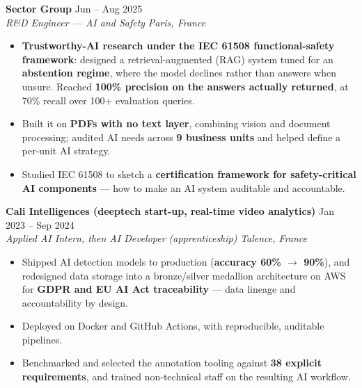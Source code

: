 \documentclass[10pt, letterpaper]{article}
\newcommand{\entry}[4]{%
  \noindent \textbf{#1} \hfill #2 \\
  \textit{#3} \hfill \textit{#4} \par
}
\begin{document}
\vspace{5pt}

\entry{Sector Group}{Jun -- Aug 2025}{R\&D Engineer --- AI and Safety}{Paris, France}
\begin{itemize}
    \item \textbf{Trustworthy-AI research under the \textbf{IEC 61508} functional-safety framework}: designed a retrieval-augmented (RAG) system tuned for an \textbf{abstention regime}, where the model declines rather than answers when unsure. Reached \textbf{100\% precision on the answers actually returned}, at 70\% recall over 100+ evaluation queries.
    \item Built it on \textbf{PDFs with no text layer}, combining vision and document processing; audited AI needs across \textbf{9 business units} and helped define a per-unit AI strategy.
    \item Studied IEC 61508 to sketch a \textbf{certification framework for safety-critical AI components} --- how to make an AI system auditable and accountable.
\end{itemize}

\vspace{5pt}

\entry{Cali Intelligences (deeptech start-up, real-time video analytics)}{Jan 2023 -- Sep 2024}%
{Applied AI Intern, then AI Developer (apprenticeship)}{Talence, France}
\begin{itemize}
    \item Shipped AI detection models to production (\textbf{accuracy 60\% $\to$ 90\%}), and redesigned data storage into a bronze/silver medallion architecture on AWS for \textbf{GDPR and EU AI Act traceability} --- data lineage and accountability by design.
    \item Deployed on Docker and GitHub Actions, with reproducible, auditable pipelines.
    \item Benchmarked and selected the annotation tooling against \textbf{38 explicit requirements}, and trained non-technical staff on the resulting AI workflow.
\end{itemize}

\end{document}
